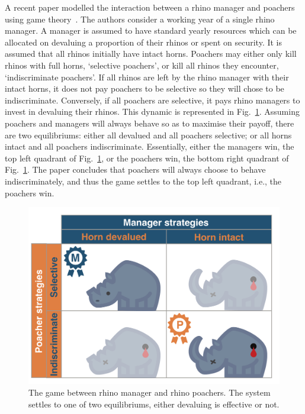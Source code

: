 \documentclass[10pt]{article}
\begin{document}
A recent paper modelled the interaction between a rhino manager and poachers
using game theory~\cite{Lee}.  The authors consider a working year of a single 
rhino manager.  A manager is assumed to have standard yearly resources which
can be allocated on devaluing a proportion of their rhinos or spent on security. 
It is assumed that all rhinos initially have intact horns. Poachers may either only
kill rhinos with full horns, `selective poachers', or kill all rhinos they encounter, 
`indiscriminate poachers'. If all rhinos are left by the rhino manager with their 
intact horns, it does not pay poachers to be selective so they will chose to be 
indiscriminate. Conversely, if all poachers are selective, it pays rhino managers 
to invest in devaluing their rhinos. This dynamic is represented in Fig.~\ref{fig:RhinoPic}.
Assuming poachers and managers will always behave so as to maximise their 
payoff, there are two equilibriums: either all devalued and all poachers selective;
or all horns intact and all poachers indiscriminate. Essentially, either the managers 
win, the top left quadrant of Fig.~\ref{fig:RhinoPic}, or the poachers win, the bottom
right quadrant of Fig.~\ref{fig:RhinoPic}. The paper concludes that poachers will
always choose to behave indiscriminately, and thus the game settles to the top
left quadrant, i.e., the poachers win.

\begin{figure}[!htbp]
	\centering
	\includegraphics[scale=0.2]{images/RhinoPic.pdf}
	\caption{\label{fig:RhinoPic} The game between rhino manager and rhino 
	poachers. The system settles to one of two equilibriums, either devaluing is effective or not.}
\end{figure}
\end{document}
